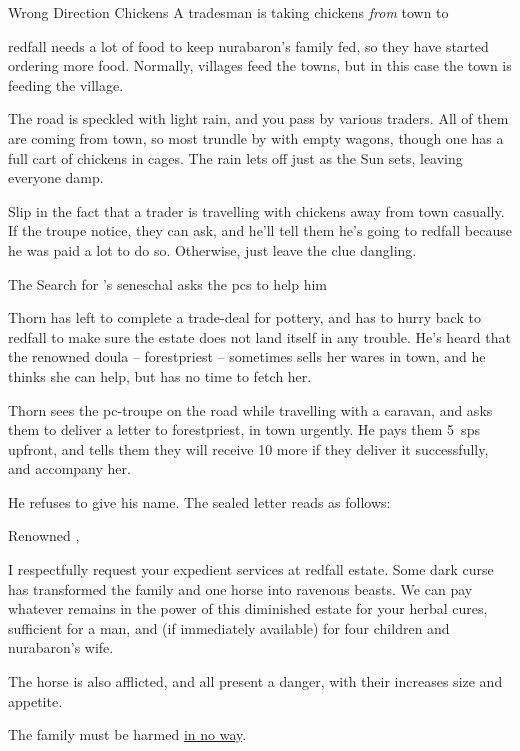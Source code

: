 {Wrong Direction Chickens}%
{A tradesman is taking chickens \emph{from} town to }%

\Gls{redfall} needs a lot of food to keep \gls{nurabaron}'s family fed, so they have started ordering more food.
Normally, \glspl{village} feed the towns, but in this case the town is feeding the village.

\begin{boxtext}
  The road is speckled with light rain, and you pass by various traders.
  All of them are coming from \gls{town}, so most trundle by with empty wagons, though one has a full cart of chickens in cages.
  The rain lets off just as the Sun sets, leaving everyone damp.
\end{boxtext}

Slip in the fact that a trader is travelling with chickens away from \gls{town} casually.
If the troupe notice, they can ask, and he'll tell them he's going to \gls{redfall} because he was paid a lot to do so.
Otherwise, just leave the clue dangling.

{The Search for }%
{'s seneschal asks the \glspl{pc} to help him}%
\label{nonstarter}

\begin{exampletext}
  Thorn has left to complete a trade-deal for pottery, and has to hurry back to \gls{redfall} to make sure the estate does not land itself in any trouble.
  He's heard that the renowned \gls{doula} -- \gls{forestpriest} -- sometimes sells her wares in \gls{town}, and he thinks she can help, but has no time to fetch her.
\end{exampletext}

Thorn sees the \gls{pc}-troupe on the road while travelling with a caravan, and asks them to deliver a letter to \gls{forestpriest}, in \gls{town} urgently.
He pays them 5~\glspl{sp} upfront, and tells them they will receive 10 more if they deliver it successfully, and accompany her.

He refuses to give his name.
The sealed letter reads as follows:

\begin{speechtext}
  Renowned ,

  I respectfully request your expedient services at \gls{redfall} estate.
  Some dark curse has transformed the family and one horse into ravenous beasts.
  We can pay whatever remains in the power of this diminished estate for your herbal cures, sufficient for a man, and (if immediately available) for four children and \gls{nurabaron}'s wife.

  The horse is also afflicted, and all present a danger, with their increases size and appetite.

  The family must be harmed \underline{in no way}.
\end{speechtext}

